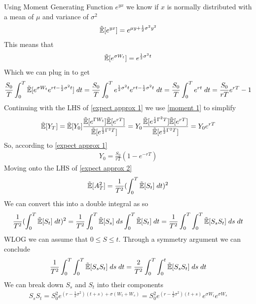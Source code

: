 \documentclass[reqno]{amsart}
\newcommand{\rE}[1]{\tilde{\E}[#1]}
\begin{document}
Using Moment Generating Function $e^{yx}$ we know if $x$ is normally distributed with a mean of $\mu$ and variance of $\sigma^2$
\begin{align} \label{moment 1}
     \rE{e^{yx}}
     = e^{\mu y + \frac{1}{2} \sigma^2 y^2}
\end{align}
This means that
\begin{align} 
     \rE{e^{\sigma W_t}}
     = e^{\frac{1}{2}\sigma^2 t}
\end{align}
Which we can plug in to get
\begin{align} 
     \frac{S_0}{T} \int_0^T\rE{e^{\sigma W_t}e^{rt-\frac{1}{2}\sigma^2t}} \; dt
     = \frac{S_0}{T} \int_0^T e^{\frac{1}{2}\sigma^2 t} e^{rt-\frac{1}{2}\sigma^2t} \; dt
     = \frac{S_0}{T} \int_0^T e^{rt} \; dt
     = \frac{S_0}{rT} e^{rT}-1
\end{align}
Continuing with the LHS of \eqref{expect approx 1} we use \eqref{moment 1} to simplify
\begin{align} 
     \rE{Y_T} 
     = \rE{Y_0} \frac{\rE{e^{\Gamma W_t}}\rE{e^{rT}}}{\rE{e^{\frac{1}{2}\Gamma^2T}}} 
     = Y_0 \frac{\rE{e^{\frac{1}{2}\Gamma^2T}}\rE{e^{rT}}}{\rE{e^{\frac{1}{2}\Gamma^2T}}} 
     = Y_0 e^{rT}
\end{align}
So, according to \eqref{expect approx 1}
\begin{align} 
     Y_0 = \frac{S_0}{rT}(1-e^{-rT})
\end{align}
Moving onto the LHS of  \eqref{expect approx 2}
\begin{align}
     \rE{A_T^2}
     = {\frac{1}{T^2} (\int_0^T \rE{S_t} \; dt)^2}
\end{align}
We can convert this into a double integral as so
\begin{align}
     {\frac{1}{T^2} (\int_0^T \rE{S_t} \; dt)^2}
     = {\frac{1}{T^2} \int_0^T \rE{S_s} \; ds \int_0^T \rE{S_t} \; dt}
     = {\frac{1}{T^2} \int_0^T \int_0^T \rE{S_s S_t} \; ds \; dt}
\end{align}
WLOG we can assume that $0 \leq S \leq t$. Through a symmetry argument we can conclude
\begin{align}
     {\frac{1}{T^2} \int_0^T \int_0^T \rE{S_s S_t} \; ds \; dt}
     = {\frac{2}{T^2} \int_0^T \int_0^t \rE{S_s S_t} \; ds \; dt}
\end{align}
We can break down $S_s$ and $S_t$ into their components
\begin{align}
     S_{s} S_{t} 
     = S_0^2 e^{(r-\frac{1}{2}\sigma^2)(t+s)+\sigma(W_t+W_s)}
     = S_0^2 e^{(r-\frac{1}{2}\sigma^2)(t+s)} e^{\sigma W_t} e^{\sigma W_s}
\end{align}
\end{document}
